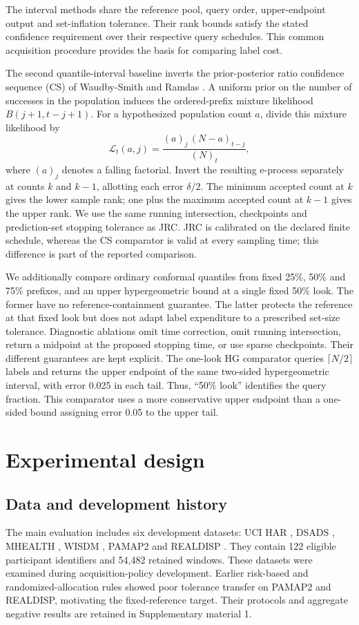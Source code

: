 \documentclass[preprint,12pt]{elsarticle}
\begin{document}
The interval methods share the reference pool, query order, upper-endpoint output and set-inflation tolerance. Their rank bounds satisfy the stated confidence requirement over their respective query schedules. This common acquisition procedure provides the basis for comparing label cost.

The second quantile-interval baseline inverts the prior-posterior ratio confidence sequence (CS) of Waudby-Smith and Ramdas \cite{wor}. A uniform prior on the number of successes in the population induces the ordered-prefix mixture likelihood $B(j+1,t-j+1)$. For a hypothesized population count $a$, divide this mixture likelihood by
\begin{equation}
 \mathcal L_t(a,j)=
 \frac{(a)_j\,(N-a)_{t-j}}{(N)_t},
 \label{eq:likelihood}
\end{equation}
where $(a)_j$ denotes a falling factorial. Invert the resulting e-process separately at counts $k$ and $k-1$, allotting each error $\delta/2$. The minimum accepted count at $k$ gives the lower sample rank; one plus the maximum accepted count at $k-1$ gives the upper rank. We use the same running intersection, checkpoints and prediction-set stopping tolerance as JRC. JRC is calibrated on the declared finite schedule, whereas the CS comparator is valid at every sampling time; this difference is part of the reported comparison.

We additionally compare ordinary conformal quantiles from fixed 25\%, 50\% and 75\% prefixes, and an upper hypergeometric bound at a single fixed 50\% look. The former have no reference-containment guarantee. The latter protects the reference at that fixed look but does not adapt label expenditure to a prescribed set-size tolerance. Diagnostic ablations omit time correction, omit running intersection, return a midpoint at the proposed stopping time, or use sparse checkpoints. Their different guarantees are kept explicit.
The one-look HG comparator queries $\lceil N/2\rceil$ labels and returns the upper endpoint of the same two-sided hypergeometric interval, with error 0.025 in each tail. Thus, ``50\% look'' identifies the query fraction. This comparator uses a more conservative upper endpoint than a one-sided bound assigning error 0.05 to the upper tail.

\section{Experimental design}
\label{sec:experiments}
\subsection{Data and development history}
The main evaluation includes six development datasets: UCI HAR \cite{har}, DSADS \cite{dsads}, MHEALTH \cite{mhealth}, WISDM \cite{wisdm}, PAMAP2 \cite{pamap} and REALDISP \cite{realdisp}. They contain 122 eligible participant identifiers and 54,482 retained windows. These datasets were examined during acquisition-policy development. Earlier risk-based and randomized-allocation rules showed poor tolerance transfer on PAMAP2 and REALDISP, motivating the fixed-reference target. Their protocols and aggregate negative results are retained in Supplementary material 1.
\end{document}
